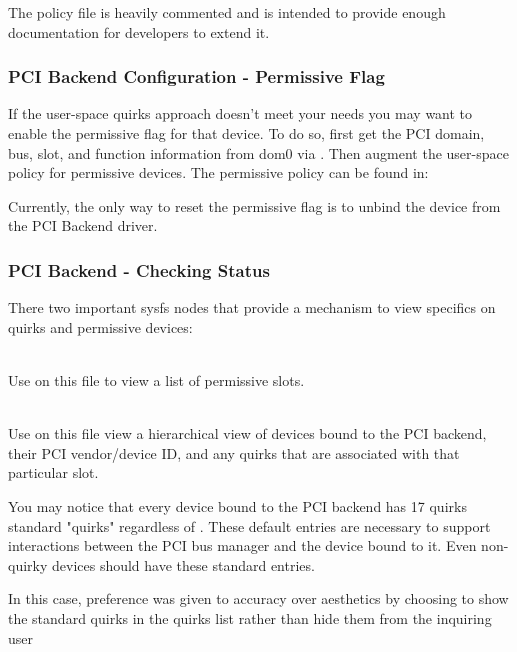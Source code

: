 \documentclass[11pt,twoside,final,openright]{report}
\begin{document}
\centerline{  }

The policy file is heavily commented and is intended to provide enough
documentation for developers to extend it.

\subsubsection{PCI Backend Configuration - Permissive Flag}
If the user-space quirks approach doesn't meet your needs you may want to enable
the permissive flag for that device.  To do so, first get the PCI domain, bus,
slot, and function information from dom0 via .  Then augment the
user-space policy for permissive devices.  The permissive policy can be found
in:

\centerline{  }

Currently, the only way to reset the permissive flag is to unbind the device
from the PCI Backend driver.

\subsubsection{PCI Backend - Checking Status}
There two important sysfs nodes that provide a mechanism to view specifics on
quirks and permissive devices:
\begin{description}
\item {} \\
 Use  on this file to view a list of permissive slots.
\item {} \\
 Use  on this file view a hierarchical view of devices bound to the
PCI backend, their PCI vendor/device ID, and any quirks that are associated with
that particular slot.  
\end{description}

You may notice that every device bound to the PCI backend has 17 quirks standard 
"quirks" regardless of .  These default entries are
necessary to support interactions between the PCI bus manager and the device bound
to it.  Even non-quirky devices should have these standard entries.  

In this case, preference was given to accuracy over aesthetics by choosing to
show the standard quirks in the quirks list rather than hide them from the
inquiring user 
\end{document}
